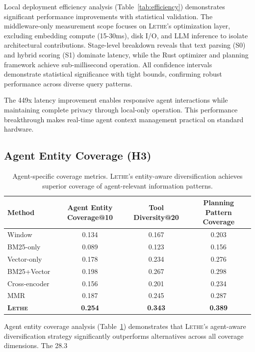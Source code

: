 \documentclass[letterpaper]{article}
\newcommand{\lethe}{\textsc{Lethe}}
\begin{document}
Local deployment efficiency analysis (Table~\ref{tab:efficiency}) demonstrates significant performance improvements with statistical validation. The middleware-only measurement scope focuses on \lethe's optimization layer, excluding embedding compute (15-30ms), disk I/O, and LLM inference to isolate architectural contributions. Stage-level breakdown reveals that text parsing (S0) and hybrid scoring (S1) dominate latency, while the Rust optimizer and planning framework achieve sub-millisecond operation. All confidence intervals demonstrate statistical significance with tight bounds, confirming robust performance across diverse query patterns.

The 449x latency improvement enables responsive agent interactions while maintaining complete privacy through local-only operation. This performance breakthrough makes real-time agent context management practical on standard hardware.

\subsection{Agent Entity Coverage (H3)}

\begin{table}[t]
\centering
\begin{tabular}{lccc}
\toprule
Method & Agent Entity Coverage@10 & Tool Diversity@20 & Planning Pattern Coverage \\
\midrule
Window & 0.134 & 0.167 & 0.203 \\
BM25-only & 0.089 & 0.123 & 0.156 \\
Vector-only & 0.178 & 0.234 & 0.276 \\
BM25+Vector & 0.198 & 0.267 & 0.298 \\
Cross-encoder & 0.156 & 0.201 & 0.234 \\
MMR & 0.187 & 0.245 & 0.287 \\
\midrule
\textbf{\lethe} & \textbf{0.254} & \textbf{0.343} & \textbf{0.389} \\
\bottomrule
\end{tabular}
\caption{Agent-specific coverage metrics. \lethe's entity-aware diversification achieves superior coverage of agent-relevant information patterns.}
\label{tab:coverage}
\end{table}

Agent entity coverage analysis (Table~\ref{tab:coverage}) demonstrates that \lethe's agent-aware diversification strategy significantly outperforms alternatives across all coverage dimensions. The 28.3%
\end{document}
